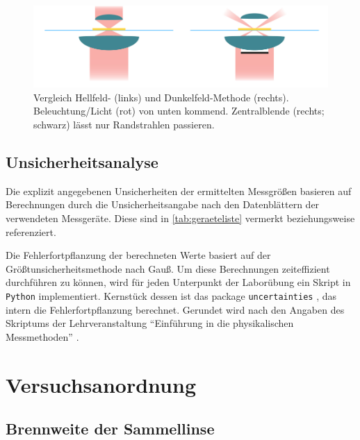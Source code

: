 \documentclass[ngerman]{scrartcl}
\begin{document}
%
\begin{figure}[H]
    \centering
    \begin{samepage}
        \includegraphics[width=\linewidth]{fig/Hell_vs_Dunkelfeld.png}
        \caption[Aufbau eines Dunkelfeldmikroskop]{Vergleich Hellfeld- (links) und Dunkelfeld-Methode (rechts). Beleuchtung/Licht (rot) von unten kommend. Zentralblende (rechts; schwarz) lässt nur Randstrahlen passieren.}
        \label{fig:dunkelfeld_skizze}
    \end{samepage}
\end{figure}


\subsection{Unsicherheitsanalyse}
\label{subsec:unsicherheitsanalyse}

Die explizit angegebenen Unsicherheiten der ermittelten Messgrößen basieren auf Berechnungen durch die Unsicherheitsangabe nach den Datenblättern der verwendeten Messgeräte. Diese sind in \autoref{tab:geraeteliste} vermerkt beziehungsweise referenziert.

Die Fehlerfortpflanzung der berechneten Werte basiert auf der Größtunsicherheitsmethode nach Gauß. Um diese Berechnungen zeiteffizient durchführen zu können, wird für jeden Unterpunkt der Laborübung ein Skript in \verb!Python! implementiert. Kernstück dessen ist das package \verb!uncertainties! \cite{ref:uncertainties}, das intern die Fehlerfortpflanzung berechnet. Gerundet wird nach den Angaben des Skriptums der Lehrveranstaltung \enquote{Einführung in die physikalischen Messmethoden} \cite{ref:messmethoden}.



\section{Versuchsanordnung}
\label{sec:versuchsanordnung}

\subsection{Brennweite der Sammellinse}
\label{subsec:versuchsanordnung_sammellinse}
\end{document}
